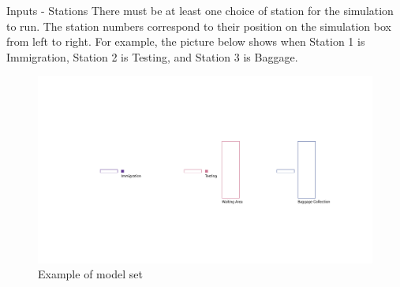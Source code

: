 \documentclass{beamer}
\begin{document}
\begin{frame}{Inputs - Stations}
	There must be at least one choice of station for the simulation to run. The station numbers correspond to their position on the simulation box from left to right. For example, the picture below shows when Station 1 is Immigration, Station 2 is Testing, and Station 3 is Baggage.
	
	\begin{figure}
		\includegraphics[scale=0.2]{../img/example1}
		\caption{Example of model set}
	\end{figure}
	
\end{frame}
\end{document}
